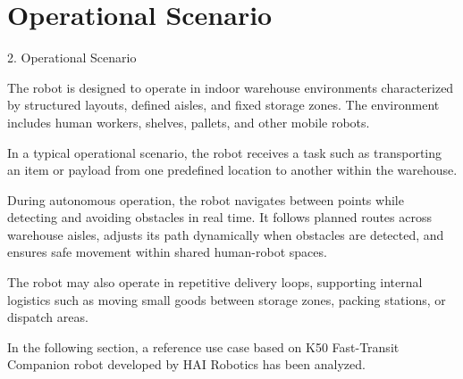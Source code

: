 \chapter{Operational Scenario}

2. Operational Scenario

The robot is designed to operate in indoor warehouse environments characterized by structured layouts, defined aisles, and fixed storage zones. The environment includes human workers, shelves, pallets, and other mobile robots.

In a typical operational scenario, the robot receives a task such as transporting an item or payload from one predefined location to another within the warehouse.

During autonomous operation, the robot navigates between points while detecting and avoiding obstacles in real time. It follows planned routes across warehouse aisles, adjusts its path dynamically when obstacles are detected, and ensures safe movement within shared human-robot spaces.

The robot may also operate in repetitive delivery loops, supporting internal logistics such as moving small goods between storage zones, packing stations, or dispatch areas.

In the following section, a reference use case based on K50 Fast-Transit Companion robot developed by HAI Robotics has been analyzed.

